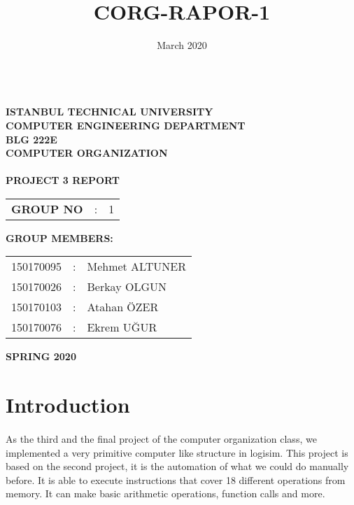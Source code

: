 \documentclass{article}
\title{CORG-RAPOR-1}
\date{March 2020}
\begin{document}
\begin{titlepage}
\begin{center}
\textbf{}\\
\textbf{\Large{ISTANBUL TECHNICAL UNIVERSITY}}\\
\vspace{0.5cm}
\textbf{\Large{COMPUTER ENGINEERING DEPARTMENT}}\\
\vspace{2cm}
\textbf{\Large{BLG 222E\\ COMPUTER ORGANIZATION\\ }}\\
\vspace{1cm}
\textbf{\Large{PROJECT 3 REPORT}}\\
\vspace{2.8cm}
\begin{table}[ht]
\centering
\Large{
\begin{tabular}{lcl}
\textbf{GROUP NO}  & : & 1 \\
\end{tabular}}
\end{table}
\vspace{1cm}
\textbf{\Large{GROUP MEMBERS:}}\\
\begin{table}[ht]
\centering
\Large{
\begin{tabular}{rcl}
150170095  & : & Mehmet ALTUNER \\
150170026  & : & Berkay OLGUN \\
150170103  & : & Atahan ÖZER \\
150170076  & : & Ekrem UĞUR \\
\end{tabular}}
\end{table}
\vspace{2.8cm}
\textbf{\Large{SPRING 2020}}

\end{center}

\end{titlepage}

\tableofcontents
\newpage
\section{Introduction}
\paragraph{}
As the third and the final project of the computer organization class, we implemented a very primitive computer like structure in logisim. This project is based on the second project, it is the automation of what we could do manually before. It is able to execute instructions that cover 18 different operations from memory. It can make basic arithmetic operations, function calls and more.
\end{document}
